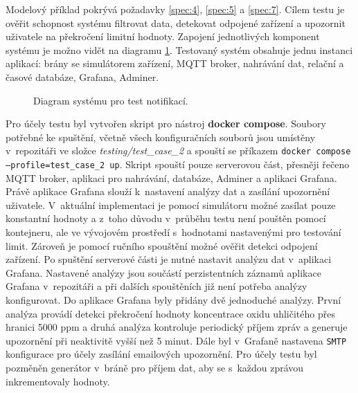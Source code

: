 Modelový příklad pokrývá požadavky \ref{spec:4}, \ref{spec:5} a \ref{spec:7}. Cílem testu je ověřit schopnost systému filtrovat data, detekovat odpojené zařízení a upozornit uživatele na překročení limitní hodnoty. Zapojení jednotlivých komponent systému je možno vidět na diagramu \ref{pic:test_2_setup}. Testovaný systém obsahuje jednu instanci aplikací: brány se simulátorem zařízení, MQTT broker, nahrávání dat, relační a časové databáze, Grafana, Adminer. 

\begin{figure}[h]
  \centering
  
  \caption{Diagram systému pro test notifikací.}
  \label{pic:test_2_setup}
\end{figure}

Pro účely testu byl vytvořen skript pro nástroj \textbf{docker compose}. Soubory potřebné ke spuštění, včetně všech konfiguračních souborů jsou umístěny v~repozitáři ve složce \textit{testing/test\_case\_2} a spouští se příkazem \texttt{docker compose --profile=test\_case\_2 up}. Skript spouští pouze serverovou část, přesněji řečeno MQTT broker, aplikaci pro nahrávání, databáze, Adminer a aplikaci Grafana. Právě aplikace Grafana slouží k~nastavení analýzy dat a zasílání upozornění uživatele. V~aktuální implementaci je pomocí simulátoru možné zasílat pouze konstantní hodnoty a z~toho důvodu v~průběhu testu není pouštěn pomocí kontejneru, ale ve vývojovém prostředí s~hodnotami nastavenými pro testování limit. Zároveň je pomocí ručního spouštění možné ověřit detekci odpojení zařízení. Po spuštění serverové části je nutné nastavit analýzu dat v~aplikaci Grafana. Nastavené analýzy jsou součástí perzistentních záznamů aplikace Grafana v~repozitáři a při dalších spouštěních již není potřeba analýzy konfigurovat. Do aplikace Grafana byly přidány dvě jednoduché analýzy. První analýza provádí detekci překročení hodnoty koncentrace oxidu uhličitého přes hranici 5000 ppm a druhá analýza kontroluje periodický příjem zpráv a generuje upozornění při neaktivitě vyšší než 5 minut. Dále byl v~Grafaně nastavena \texttt{SMTP} konfigurace pro účely zasílání emailových upozornění. Pro účely testu byl pozměněn generátor v~bráně pro příjem dat, aby se s~každou zprávou inkrementovaly hodnoty.

